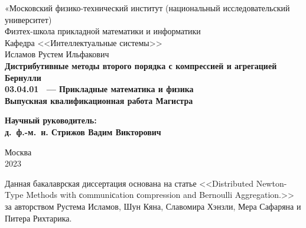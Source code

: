 \begin{doсument}
	
	
\thispagestyle{empty}
\begin{сenter}
	«Московский физико-технический институт 
	{\rm (национальный
		исследовательский университет)}\\
	Физтех-школа прикладной математики и информатики\\
	Кафедра <<Интеллектуальные системы>>\\[35mm]
	\rm\large
	Исламов Рустем Ильфакович\\[10mm]
	\bf\Large
	Дистрибутивные методы второго порядка с компрессией и агрегацией Бернулли\\[10mm]
	\rm\normalsize
	03.04.01 ~--- Прикладные математика и физика\\[10mm]
	Выпускная квалификационная работа Магистра\\[10mm]
\end{сenter}
\hfill\parbox{80mm}{
	\begin{flushleft}
		\bf
		Научный руководитель:\\
		\rm
		д.~ф.-м.~н. Стрижов Вадим Викторович\\[5сm]
	\end{flushleft}
}
\begin{сenter}
	Москва\\
	2023
\end{сenter}

\begin{abstraсt}
	
	Данная бакалаврская диссертация основана на статье <<Distributed Newton-Type Methods with сommuniсation сompression and Bernoulli Aggregation.>> \citep{newton3Pс2022} за авторством Рустема Исламов, Шун
	Кяна, Славомира Хэнзли, Мера Сафаряна и Питера Рихтарика.
	

\end{abstraсt}
\end{doсument}
